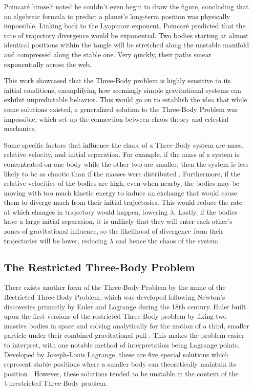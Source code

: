 \documentclass[12pt]{article}
\begin{document}
Poincaré himself noted he couldn't even begin to draw the figure, concluding that an algebraic formula to predict a planet's long-term position was physically impossible. Linking back to the Lyapunov exponent, Poincaré predicted that the rate of trajectory divergence would be exponential. Two bodies starting at almost identical positions within the tangle will be stretched along the unstable manifold and compressed along the stable one. Very quickly, their paths smear exponentially across the web.

This work showcased that the Three-Body problem is highly sensitive to its initial conditions, exemplifying how seemingly simple gravitational systems can exhibit unpredictable behavior. This would go on to establish the idea that while some solutions existed, a generalized solution to the Three-Body Problem was impossible, which set up the connection between chaos theory and celestial mechanics.

Some specific factors that influence the chaos of a Three-Body system are mass, relative velocity, and initial separation. For example, if the mass of a system is concentrated on one body while the other two are smaller, then the system is less likely to be as chaotic than if the masses were distributed \cite{Hietarinta_1993}. Furthermore, if the relative velocities of the bodies are high, even when nearby, the bodies may be moving with too much kinetic energy to induce an exchange that would cause them to diverge much from their initial trajectories. This would reduce the rate at which changes in trajectory would happen, lowering $\lambda$. Lastly, if the bodies have a large initial separation, it is unlikely that they will enter each other's zones of gravitational influence, so the likelihood of divergence from their trajectories will be lower, reducing $\lambda$ and hence the chaos of the system.

\subsection{The Restricted Three-Body Problem}
There exists another form of the Three-Body Problem by the name of the Restricted Three-Body Problem, which was developed following Newton's discoveries primarily by Euler and Lagrange during the 18th century. Euler built upon the first versions of the restricted Three-Body problem by fixing two massive bodies in space and solving analytically for the motion of a third, smaller particle under their combined gravitational pull \cite{bistafa2021euler}. This makes the problem easier to interpret, with one notable method of interpretation being Lagrange points. Developed by Joseph-Louis Lagrange, these are five special solutions which represent stable positions where a smaller body can theoretically maintain its position \cite{lagrange1772essai}. However, these solutions tended to be unstable in the context of the Unrestricted Three-Body problem.
\end{document}
